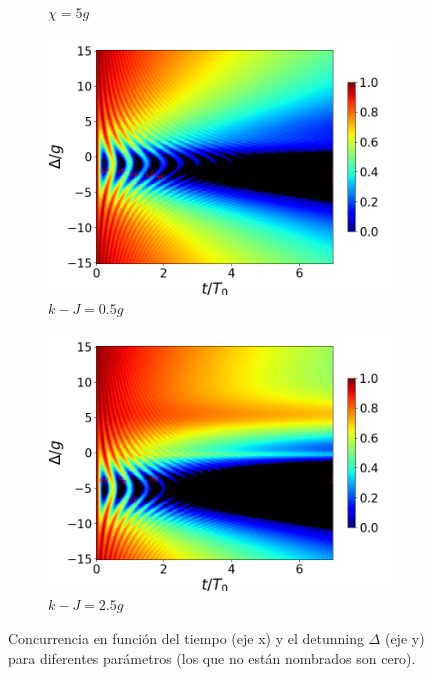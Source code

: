 \begin{figure}[h]
\begin{subfigure}{0.49\textwidth}
        \caption{$\chi=5g$}
        \label{fig4:concu detunning x2}
    \end{subfigure}
    \vfill
    \begin{subfigure}{0.49\textwidth}
        \includegraphics[width=\textwidth]{figuras/ch4/concu/delta/eg0+ge0 k=0.5g x=0.0g J=0.0g gamma=0.25g concu delta dis.png}
        \caption{$k-J=0.5g$}
        \label{fig4:concu detunning k1}
    \end{subfigure}
    \hfill
    \begin{subfigure}{0.49\textwidth}
        \includegraphics[width=\textwidth]{figuras/ch4/concu/delta/eg0+ge0 k=2.5g x=0.0g J=0.0g gamma=0.25g concu delta dis.png}
        \caption{$k-J=2.5g$}
        \label{fig4:concu detunning k2}
    \end{subfigure}
    \caption{Concurrencia en función del tiempo (eje x) y el detunning $\Delta$ (eje y) para diferentes parámetros (los que no están nombrados son cero).}
    \label{fig4:concu detunning 0 params}
\end{figure}
